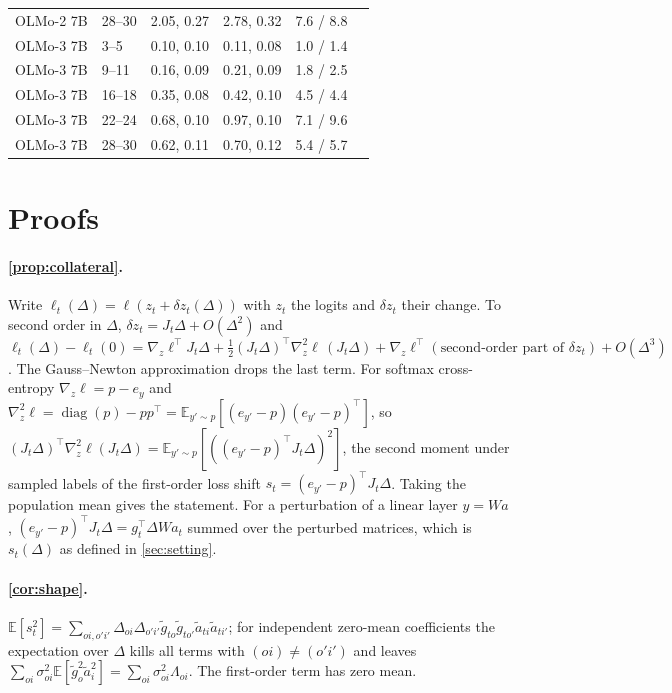 \documentclass{article}
\theoremstyle{definition}\newtheorem{law}{Empirical law}
\newcommand{\E}{\mathbb{E}}
\begin{document}
\begin{table}[t]
\begin{tabular}{llcccc}
OLMo-2 7B & 28--30 & 2.05, 0.27 & 2.78, 0.32 & 7.6 / 8.8 &\\
OLMo-3 7B & 3--5 & 0.10, 0.10 & 0.11, 0.08 & 1.0 / 1.4 &\\
OLMo-3 7B & 9--11 & 0.16, 0.09 & 0.21, 0.09 & 1.8 / 2.5 &\\
OLMo-3 7B & 16--18 & 0.35, 0.08 & 0.42, 0.10 & 4.5 / 4.4 &\\
OLMo-3 7B & 22--24 & 0.68, 0.10 & 0.97, 0.10 & 7.1 / 9.6 &\\
OLMo-3 7B & 28--30 & 0.62, 0.11 & 0.70, 0.12 & 5.4 / 5.7 &\\
\bottomrule
\end{tabular}
\end{table}

\section{Proofs}\label{app:proofs}

\paragraph{\cref{prop:collateral}.} Write $\ell_t(\Delta)=\ell(z_t+\delta z_t(\Delta))$ with $z_t$ the logits and $\delta z_t$ their change. To second order in $\Delta$, $\delta z_t=J_t\Delta+O(\Delta^2)$ and $\ell_t(\Delta)-\ell_t(0)=\nabla_z\ell^\top J_t\Delta+\tfrac12(J_t\Delta)^\top\nabla^2_z\ell\,(J_t\Delta)+\nabla_z\ell^\top(\text{second-order part of }\delta z_t)+O(\Delta^3)$. The Gauss--Newton approximation drops the last term. For softmax cross-entropy $\nabla_z\ell=p-e_y$ and $\nabla_z^2\ell=\operatorname{diag}(p)-pp^\top=\E_{y'\sim p}[(e_{y'}-p)(e_{y'}-p)^\top]$, so $(J_t\Delta)^\top\nabla_z^2\ell(J_t\Delta)=\E_{y'\sim p}[((e_{y'}-p)^\top J_t\Delta)^2]$, the second moment under sampled labels of the first-order loss shift $s_t=(e_{y'}-p)^\top J_t\Delta$. Taking the population mean gives the statement. For a perturbation of a linear layer $y=Wa$, $(e_{y'}-p)^\top J_t\Delta=g_t^\top\Delta W a_t$ summed over the perturbed matrices, which is $s_t(\Delta)$ as defined in \cref{sec:setting}.

\paragraph{\cref{cor:shape}.} $\E[s_t^2]=\sum_{oi,o'i'}\Delta_{oi}\Delta_{o'i'}\tilde g_{to}\tilde g_{to'}\tilde a_{ti}\tilde a_{ti'}$; for independent zero-mean coefficients the expectation over $\Delta$ kills all terms with $(oi)\ne(o'i')$ and leaves $\sum_{oi}\sigma_{oi}^2\E[\tilde g_o^2\tilde a_i^2]=\sum_{oi}\sigma_{oi}^2\Lambda_{oi}$. The first-order term has zero mean.
\end{document}
